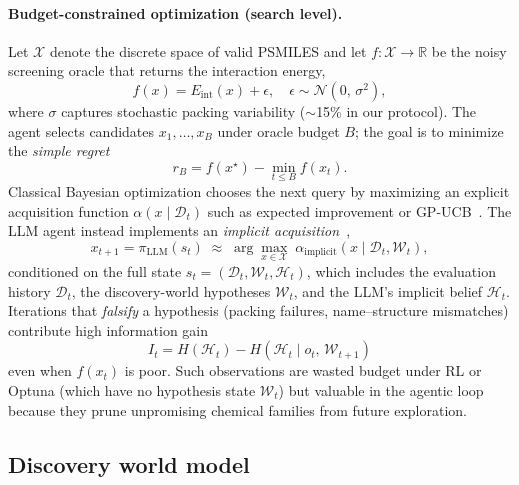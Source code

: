 \documentclass[twocolumn]{fairmeta}
\begin{document}
\paragraph{Budget-constrained optimization (search level).}
Let $\mathcal{X}$ denote the discrete space of valid PSMILES and let $f\!:\!\mathcal{X}\!\to\!\mathbb{R}$ be the noisy screening oracle that returns the interaction energy,
\begin{equation}
f(x) = E_\text{int}(x) + \epsilon, \quad \epsilon \sim \mathcal{N}(0,\,\sigma^2),
\label{eq:oracle}
\end{equation}
where $\sigma$ captures stochastic packing variability (${\sim}$15\% in our protocol).
The agent selects candidates $x_1,\ldots,x_B$ under oracle budget $B$; the goal is to minimize the \emph{simple regret}~\cite{shahriari2016bayesopt,srinivas2010gpucb}
\begin{equation}
r_B = f(x^\star) - \min_{t \le B} f(x_t).
\label{eq:regret}
\end{equation}
Classical Bayesian optimization chooses the next query by maximizing an explicit acquisition function $\alpha(x \mid \mathcal{D}_t)$ such as expected improvement or GP-UCB~\cite{srinivas2010gpucb}.
The LLM agent instead implements an \emph{implicit acquisition}~\cite{yang2024opro,liu2025igpo},
\begin{equation}
x_{t+1} = \pi_\text{LLM}(s_t) \;\approx\; \arg\max_{x\in\mathcal{X}}\; \alpha_\text{implicit}(x \mid \mathcal{D}_t, \mathcal{W}_t),
\label{eq:implicit_acq}
\end{equation}
conditioned on the full state $s_t = (\mathcal{D}_t, \mathcal{W}_t, \mathcal{H}_t)$, which includes the evaluation history $\mathcal{D}_t$, the discovery-world hypotheses $\mathcal{W}_t$, and the LLM's implicit belief $\mathcal{H}_t$.
Iterations that \emph{falsify} a hypothesis (packing failures, name--structure mismatches) contribute high information gain
\begin{equation}
I_t = H(\mathcal{H}_t) - H(\mathcal{H}_t \mid o_t,\, \mathcal{W}_{t+1})
\label{eq:infogain}
\end{equation}
even when $f(x_t)$ is poor.
Such observations are wasted budget under RL or Optuna (which have no hypothesis state $\mathcal{W}_t$) but valuable in the agentic loop because they prune unpromising chemical families from future exploration.

\subsection{Discovery world model}
\end{document}
